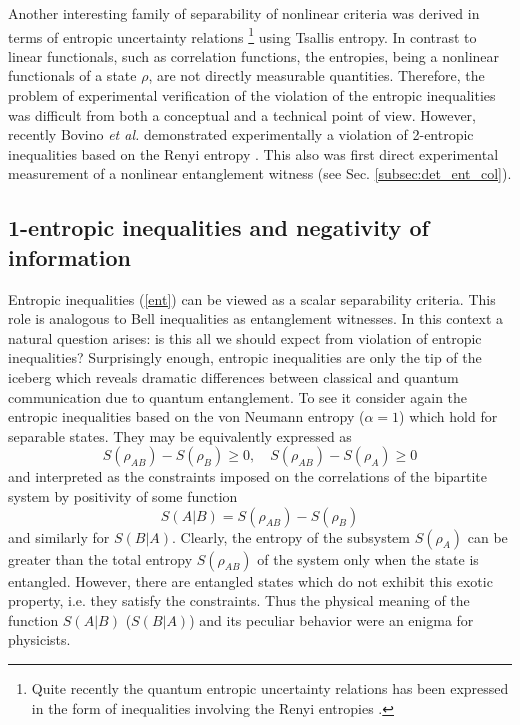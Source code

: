 \documentclass[rmp,12pt,preprint]{revtex4-2}
\begin{document}
Another interesting family of separability of nonlinear criteria was
derived \cite {GuehneL2004-pra} in terms of entropic uncertainty relations
\cite{Birula,Deutsch,Kraus,MaasssenU1988}\footnote{Quite recently the
  quantum entropic uncertainty relations has been expressed in the
  form of inequalities involving the Renyi entropies
  \cite{bialynickibirula-2006-74}.} using Tsallis entropy.  In contrast
to linear functionals, such as correlation functions, the entropies,
being a nonlinear functionals of a state $\rho$, are not directly
measurable quantities. Therefore, the problem of experimental
verification of the violation of the entropic inequalities was
difficult from both a conceptual and a technical point of
view. However, recently Bovino \emph{et al.}  demonstrated
experimentally a violation of 2-entropic inequalities based on the
Renyi entropy \cite {NonlinExp}. This also was first direct
experimental measurement of a nonlinear entanglement witness (see
Sec. \ref{subsec:det_ent_col}).

\subsection {1-entropic inequalities and negativity of information}

Entropic inequalities (\ref{ent}) can be viewed as a scalar
separability criteria. This role is analogous to Bell inequalities as
entanglement witnesses. In this context a natural question arises: is
this all we should expect from violation of entropic inequalities?
Surprisingly enough, entropic inequalities are only the tip of the
iceberg which reveals dramatic differences between classical and
quantum communication due to quantum entanglement. To see it consider
again the entropic inequalities based on the von Neumann entropy
($\alpha=1$) which hold for separable states. They may be equivalently
expressed as
\begin{equation}
S(\rho_{AB}) - S(\rho _B)\geq0, \quad  S(\rho_{AB})- S(\rho _A)\geq0
\label{pur1}
\end{equation}
and interpreted as the constraints imposed on the correlations of the
bipartite system by positivity of some function
\begin{equation}
S(A|B) = S(\rho_{AB}) - S(\rho_B) \label{pur2}
\end{equation}
and similarly for $S(B|A)$. Clearly, the entropy of the subsystem
$S(\rho_A)$ can be greater than the total entropy $S(\rho_{AB})$ of
the system only when the state is entangled.  However, there are
entangled states which do not exhibit this exotic property, i.e. they
satisfy the constraints. Thus the physical meaning of the function
$S(A|B)$ ($S(B|A)$) and its peculiar behavior were an enigma for
physicists.
\end{document}
